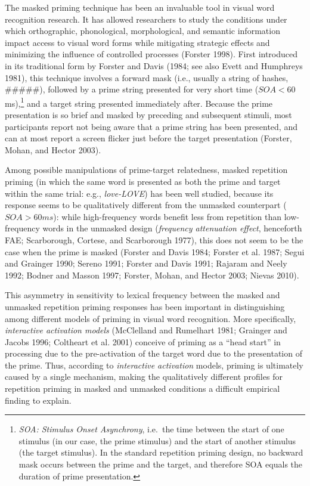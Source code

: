 \documentclass[
]{interact}
\begin{document}
The masked priming technique has been an invaluable tool in visual word
recognition research. It has allowed researchers to study the conditions
under which orthographic, phonological, morphological, and semantic
information impact access to visual word forms while mitigating
strategic effects and minimizing the influence of controlled processes
(Forster 1998). First introduced in its traditional form by Forster and
Davis (1984; see also Evett and Humphreys 1981), this technique involves
a forward mask (i.e., usually a string of hashes, \#\#\#\#\#), followed
by a prime string presented for very short time (\(SOA < 60\)
ms),\footnote{\emph{SOA: Stimulus Onset Asynchrony}, i.e.~the time
  between the start of one stimulus (in our case, the prime stimulus)
  and the start of another stimulus (the target stimulus). In the
  standard repetition priming design, no backward mask occurs between
  the prime and the target, and therefore SOA equals the duration of
  prime presentation.} and a target string presented immediately after.
Because the prime presentation is so brief and masked by preceding and
subsequent stimuli, most participants report not being aware that a
prime string has been presented, and can at most report a screen flicker
just before the target presentation (Forster, Mohan, and Hector 2003).

Among possible manipulations of prime-target relatedness, masked
repetition priming (in which the same word is presented as both the
prime and target within the same trial: e.g., \emph{love-LOVE}) has been
well studied, because its response seems to be qualitatively different
from the unmasked counterpart (\(SOA > 60 ms\)): while high-frequency
words benefit less from repetition than low-frequency words in the
unmasked design (\emph{frequency attenuation effect}, henceforth FAE;
Scarborough, Cortese, and Scarborough 1977), this does not seem to be
the case when the prime is masked (Forster and Davis 1984; Forster et
al. 1987; Segui and Grainger 1990; Sereno 1991; Forster and Davis 1991;
Rajaram and Neely 1992; Bodner and Masson 1997; Forster, Mohan, and
Hector 2003; Nievas 2010).

This asymmetry in sensitivity to lexical frequency between the masked
and unmasked repetition priming responses has been important in
distinguishing among different models of priming in visual word
recognition. More specifically, \emph{interactive activation models}
(McClelland and Rumelhart 1981; Grainger and Jacobs 1996; Coltheart et
al. 2001) conceive of priming as a ``head start'' in processing due to
the pre-activation of the target word due to the presentation of the
prime. Thus, according to \emph{interactive activation} models, priming
is ultimately caused by a single mechanism, making the qualitatively
different profiles for repetition priming in masked and unmasked
conditions a difficult empirical finding to explain.
\end{document}
